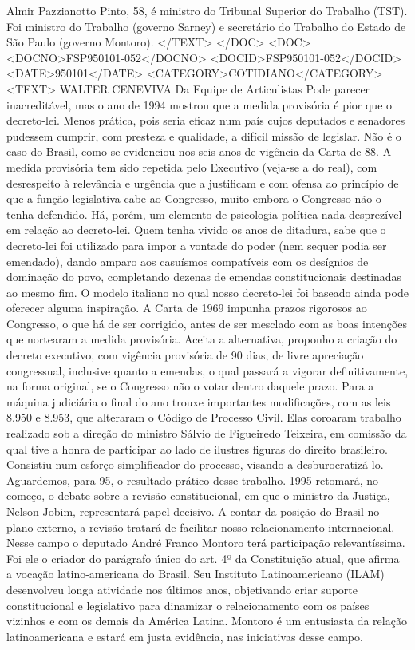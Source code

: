 Almir Pazzianotto Pinto, 58, é ministro do Tribunal Superior do Trabalho (TST). Foi ministro do Trabalho (governo Sarney) e secretário do Trabalho do Estado de São Paulo (governo Montoro).
</TEXT>
</DOC>
<DOC>
<DOCNO>FSP950101-052</DOCNO>
<DOCID>FSP950101-052</DOCID>
<DATE>950101</DATE>
<CATEGORY>COTIDIANO</CATEGORY>
<TEXT>
WALTER CENEVIVA 
Da Equipe de Articulistas 
Pode parecer inacreditável, mas o ano de 1994 mostrou que a medida provisória é pior que o decreto-lei. Menos prática, pois seria eficaz num país cujos deputados e senadores pudessem cumprir, com presteza e qualidade, a difícil missão de legislar. Não é o caso do Brasil, como se evidenciou nos seis anos de vigência da Carta de 88.
A medida provisória tem sido repetida pelo Executivo (veja-se a do real), com desrespeito à relevância e urgência que a justificam e com ofensa ao princípio de que a função legislativa cabe ao Congresso, muito embora o Congresso não o tenha defendido.
Há, porém, um elemento de psicologia política nada desprezível em relação ao decreto-lei. Quem tenha vivido os anos de ditadura, sabe que o decreto-lei foi utilizado para impor a vontade do poder (nem sequer podia ser emendado), dando amparo aos casuísmos compatíveis com os desígnios de dominação do povo, completando dezenas de emendas constitucionais destinadas ao mesmo fim.
O modelo italiano no qual nosso decreto-lei foi baseado ainda pode oferecer alguma inspiração. A Carta de 1969 impunha prazos rigorosos ao Congresso, o que há de ser corrigido, antes de ser mesclado com as boas intenções que nortearam a medida provisória. Aceita a alternativa, proponho a criação do decreto executivo, com vigência provisória de 90 dias, de livre apreciação congressual, inclusive quanto a emendas, o qual passará a vigorar definitivamente, na forma original, se o Congresso não o votar dentro daquele prazo.
Para a máquina judiciária o final do ano trouxe importantes modificações, com as leis 8.950 e 8.953, que alteraram o Código de Processo Civil. Elas coroaram trabalho realizado sob a direção do ministro Sálvio de Figueiredo Teixeira, em comissão da qual tive a honra de participar ao lado de ilustres figuras do direito brasileiro. Consistiu num esforço simplificador do processo, visando a desburocratizá-lo. Aguardemos, para 95, o resultado prático desse trabalho.
1995 retomará, no começo, o debate sobre a revisão constitucional, em que o ministro da Justiça, Nelson Jobim, representará papel decisivo. A contar da posição do Brasil no plano externo, a revisão tratará de facilitar nosso relacionamento internacional. Nesse campo o deputado André Franco Montoro terá participação relevantíssima. Foi ele o criador do parágrafo único do art. 4º da Constituição atual, que afirma a vocação latino-americana do Brasil. Seu Instituto Latinoamericano (ILAM) desenvolveu longa atividade nos últimos anos, objetivando criar suporte constitucional e legislativo para dinamizar o relacionamento com os países vizinhos e com os demais da América Latina. Montoro é um entusiasta da relação latinoamericana e estará em justa evidência, nas iniciativas desse campo.
